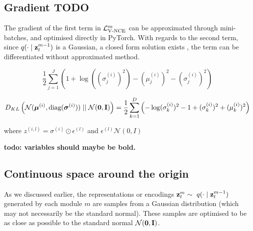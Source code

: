 	\subsection{Gradient \textbf{TODO}}
		The gradient of the first term in $\mathcal{L}_{\text{V-NCE}}^m$ can be approximated through mini-batches, and optimised directly in PyTorch. With regards to the second term, since $q(\cdot \mid \mathbf{z}_t^{m-1})$ is a Gaussian, a closed form solution exists \cite{kingmaAutoEncodingVariationalBayes2022}, the term can be differentiated without approximated method.
		
		
		\begin{equation}
			\frac{1}{2}\sum_{j=1}^J \left( 1 + \log((\sigma_j^{(i)})^2) - (\mu_j^{(i)})^2 - (\sigma_j^{(i)})^2 \right) 
		\end{equation}
		
		\begin{equation} %
			\kl{\normal}{\standardnormal} = \latentspaceconstraintclosedform
		\end{equation}
		
		
		where $z^(i,l) = \sigma ^{(i)} \odot \epsilon^{(l)}$ and $\epsilon^(l) \mathcal{N}(0, I)$
		
		\textbf{todo: variables should maybe be bold.}
		
		
	
	
	\subsection{Continuous space around the origin} \label{cha:contin_space}
			As we discussed earlier, the representations or encodings $\mathbf{z}_t^m \sim ~ q(\cdot \mid \mathbf{z}_t^{m-1})$ generated by each module $m$ are samples from a Gaussian distribution (which may not necessarily be the standard normal). These samples are optimised to be as close as possible to the standard normal $\mathcal{N}(\bm{\mathbf{0}}, \mathbf{I})$. 
	
